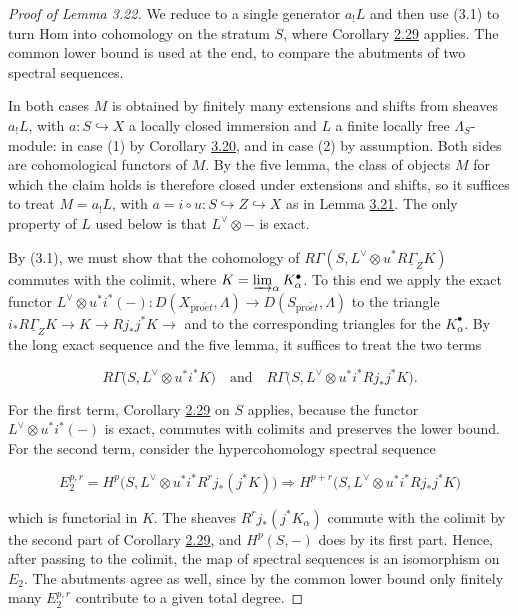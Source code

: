 \documentclass[11pt]{article}
\begin{document}
\begin{proof}[{Proof of Lemma 3.22}]\label{bp262}%
We reduce to a single generator \(a_!L\) and then use (3.1) to turn Hom into cohomology on the stratum \(S\), where Corollary \hyperref[bp86]{2.29} applies. The common lower bound is used at the end, to compare the abutments of two spectral sequences.

In both cases \(M\) is obtained by finitely many extensions and shifts from sheaves \(a_!L\), with \(a:S\hookrightarrow X\) a locally closed immersion and \(L\) a finite locally free \(\Lambda_S\)-module: in case (1) by Corollary \hyperref[bp253]{3.20}, and in case (2) by assumption. Both sides are cohomological functors of \(M\). By the five lemma, the class of objects \(M\) for which the claim holds is therefore closed under extensions and shifts, so it suffices to treat \(M=a_!L\), with \(a=i\circ
u:S\hookrightarrow Z\hookrightarrow X\) as in Lemma \hyperref[bp257]{3.21}. The only property of \(L\) used below is that \(L^\vee\otimes-\) is exact.

By (3.1), we must show that the cohomology of \(R\Gamma(S,L^\vee\otimes u^*R\underline\Gamma_ZK)\) commutes with the colimit, where \(K=\varinjlim_\alpha K_\alpha^\bullet\). To this end we apply the exact functor \(L^\vee\otimes u^*i^*(-):D(X_{\mathrm{pro}\acute{e}t},\Lambda)\to D(S_{\mathrm{pro}\acute{e}t},\Lambda)\) to the triangle \(i_*R\underline\Gamma_ZK\to K\to Rj_*j^*K\to\) and to the corresponding triangles for the \(K_\alpha^\bullet\). By the long exact sequence and the five lemma, it suffices to treat the two terms

\[
R\Gamma\bigl(S,L^\vee\otimes u^*i^*K\bigr)
\quad\text{and}\quad
R\Gamma\bigl(S,L^\vee\otimes u^*i^*Rj_*j^*K\bigr).
\]

For the first term, Corollary \hyperref[bp86]{2.29} on \(S\) applies, because the functor \(L^\vee\otimes u^*i^*(-)\) is exact, commutes with colimits and preserves the lower bound. For the second term, consider the hypercohomology spectral sequence

\[
E_2^{p,r}=H^p\bigl(S,L^\vee\otimes u^*i^*R^rj_*(j^*K)\bigr)
\Longrightarrow
H^{p+r}\bigl(S,L^\vee\otimes u^*i^*Rj_*j^*K\bigr)
\]

which is functorial in \(K\). The sheaves \(R^rj_*(j^*K_\alpha)\) commute with the colimit by the second part of Corollary \hyperref[bp86]{2.29}, and \(H^p(S,-)\) does by its first part. Hence, after passing to the colimit, the map of spectral sequences is an isomorphism on \(E_2\). The abutments agree as well, since by the common lower bound only finitely many \(E_2^{p,r}\) contribute to a given total degree.
\end{proof}
\end{document}
